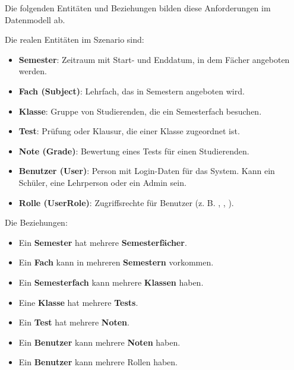 \documentclass[12pt,a4paper]{article}
\newcommand{\code}[1]{\texttt{\detokenize{#1}}}
\begin{document}
    Die folgenden Entitäten und Beziehungen bilden diese Anforderungen im Datenmodell ab.

    Die realen Entitäten im Szenario sind:

    \begin{itemize}
        \item \textbf{Semester}: Zeitraum mit Start- und Enddatum, in dem Fächer angeboten werden.
        \item \textbf{Fach (Subject)}: Lehrfach, das in Semestern angeboten wird.
        \item \textbf{Klasse}: Gruppe von Studierenden, die ein Semesterfach besuchen.
        \item \textbf{Test}: Prüfung oder Klausur, die einer Klasse zugeordnet ist.
        \item \textbf{Note (Grade)}: Bewertung eines Tests für einen Studierenden.
        \item \textbf{Benutzer (User)}: Person mit Login-Daten für das System. Kann ein Schüler, eine Lehrperson oder ein Admin sein.
        \item \textbf{Rolle (UserRole)}: Zugriffsrechte für Benutzer (z. B. \code{STUDENT}, \code{TEACHER}, \code{ADMIN}).
    \end{itemize}

    Die Beziehungen:
    \begin{itemize}
        \item Ein \textbf{Semester} hat mehrere \textbf{Semesterfächer}.
        \item Ein \textbf{Fach} kann in mehreren \textbf{Semestern} vorkommen.
        \item Ein \textbf{Semesterfach} kann mehrere \textbf{Klassen} haben.
        \item Eine \textbf{Klasse} hat mehrere \textbf{Tests}.
        \item Ein \textbf{Test} hat mehrere \textbf{Noten}.
        \item Ein \textbf{Benutzer} kann mehrere \textbf{Noten} haben.
        \item Ein \textbf{Benutzer} kann mehrere Rollen haben.
    \end{itemize}
\end{document}

